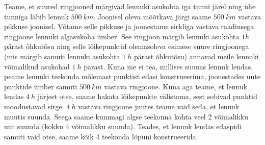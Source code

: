 Teame, et suured ringjooned märgivad lennuki asukohta iga tunni järel ning ühe tunniga läbib lennuk $\SI{500}{km}$. Joonisel oleva mõõtkava järgi saame $\SI{500}{km}$ vastava pikkuse joonisel. Võtame selle pikkuse ja joonestame sirkliga vastava raadiusega ringjoone lennuki algasukoha ümber. See ringjoon märgib lennuki asukohta $1h$ pärast õhkutõsu ning selle lõikepunktid olemasoleva esimese suure ringjoonega (mis märgib samuti lennuki asukohta $\SI{1}{h}$ pärast õhkutõsu) annavad meile lennuki võimalikud asukohad $\SI{1}{h}$ pärast. Kuna me ei tea, millises suunas lennuk lendas, peame lennuki teekonda mõlemast punktist edasi konstrueerima, joonestades uute punktide ümber samuti $\SI{500}{km}$ vastava ringjoone. Kuna aga teame, et lennuk lendas $\SI{4}{h}$ järjest otse, saame hakata lõikepunkte välistama, sest sobivad punktid moodustavad sirge. $\SI{4}{h}$ vastava ringjoone juures teame vaid seda, et lennuk muutis suunda. Seega saame kummagi algse teekonna kohta veel 2 võimalikku uut suunda (kokku 4 võimalikku suunda). Teades, et lennuk lendas edaspidi samuti vaid otse, saame kõik 4 teekonda lõpuni konstrueerida.
\probend